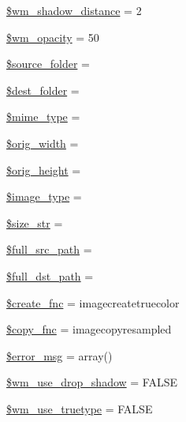 \begin{DoxyCompactItemize}
\item 
\hyperlink{class_c_i___image__lib_a3d5174ca66ce7149799b5830873aa747}{\$wm\+\_\+shadow\+\_\+distance} = 2
\item 
\hyperlink{class_c_i___image__lib_a9cc2d95dbcbb26a2f3f0c7416fc5920b}{\$wm\+\_\+opacity} = 50
\item 
\hyperlink{class_c_i___image__lib_a8fa5462b549251df178487f869c49800}{\$source\+\_\+folder} = \textquotesingle{}\textquotesingle{}
\item 
\hyperlink{class_c_i___image__lib_a23c580d10b1ba89c5b532f43fe2c6f59}{\$dest\+\_\+folder} = \textquotesingle{}\textquotesingle{}
\item 
\hyperlink{class_c_i___image__lib_a4d1985caafb49b059e3ca3dedfee257a}{\$mime\+\_\+type} = \textquotesingle{}\textquotesingle{}
\item 
\hyperlink{class_c_i___image__lib_a336a3be3539aaae0ad42aaf4c544bb41}{\$orig\+\_\+width} = \textquotesingle{}\textquotesingle{}
\item 
\hyperlink{class_c_i___image__lib_a68713f45d7d236dfdd6aafdc9668a44d}{\$orig\+\_\+height} = \textquotesingle{}\textquotesingle{}
\item 
\hyperlink{class_c_i___image__lib_a939d6733d998cce893403d2f59f40317}{\$image\+\_\+type} = \textquotesingle{}\textquotesingle{}
\item 
\hyperlink{class_c_i___image__lib_aff68567b98390e0db61065df80af5d49}{\$size\+\_\+str} = \textquotesingle{}\textquotesingle{}
\item 
\hyperlink{class_c_i___image__lib_a7ccf54c8f559eaf70600f69554be39eb}{\$full\+\_\+src\+\_\+path} = \textquotesingle{}\textquotesingle{}
\item 
\hyperlink{class_c_i___image__lib_aa830804dc9d15c51e0672bd4d3602e07}{\$full\+\_\+dst\+\_\+path} = \textquotesingle{}\textquotesingle{}
\item 
\hyperlink{class_c_i___image__lib_af70f0124d1a34ec7b7360bee16c3a3ea}{\$create\+\_\+fnc} = \textquotesingle{}imagecreatetruecolor\textquotesingle{}
\item 
\hyperlink{class_c_i___image__lib_a4c7eeae509bbd8ac493cafa8a5b9980e}{\$copy\+\_\+fnc} = \textquotesingle{}imagecopyresampled\textquotesingle{}
\item 
\hyperlink{class_c_i___image__lib_acf910733622c1fa671b9f755c69c2ec7}{\$error\+\_\+msg} = array()
\item 
\hyperlink{class_c_i___image__lib_a49b77ed476cebe5f357705e7a9c4ccce}{\$wm\+\_\+use\+\_\+drop\+\_\+shadow} = F\+A\+L\+SE
\item 
\hyperlink{class_c_i___image__lib_a0415d8aa18349f21751f7a81255918ad}{\$wm\+\_\+use\+\_\+truetype} = F\+A\+L\+SE
\end{DoxyCompactItemize}


